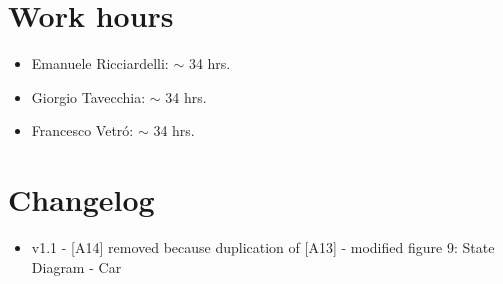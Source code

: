 \documentclass[10pt, a4paper,titlepage]{article}
\begin{document}
\section*{Work hours} 
\begin{itemize}
\item Emanuele Ricciardelli: $\sim$ 34 hrs.
\item Giorgio Tavecchia: $\sim$ 34 hrs.
\item Francesco Vetr\'o: $\sim$ 34 hrs.
\end{itemize}
\section*{Changelog}
\begin{itemize}
\item v1.1
\subitem - [A14] removed because duplication of [A13]
\subitem - modified figure 9: State Diagram - Car
\end{itemize}
\end{document}
